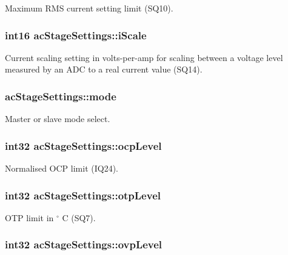 Maximum R\-M\-S current setting limit (S\-Q10). \hypertarget{a00004_ade324e2ab9ea9a6d3620cf7028cc4c1d}{
\subsubsection[{i\-Scale}]{\setlength{\rightskip}{0pt plus 5cm}int16 ac\-Stage\-Settings\-::i\-Scale}}\label{a00004_ade324e2ab9ea9a6d3620cf7028cc4c1d}
Current scaling setting in volts-\/per-\/amp for scaling between a voltage level measured by an A\-D\-C to a real current value (S\-Q14). \hypertarget{a00004_a3cb6e49a13279ff6c21dfdb9ee7f2f83}{
\subsubsection[{mode}]{ ac\-Stage\-Settings\-::mode}}\label{a00004_a3cb6e49a13279ff6c21dfdb9ee7f2f83}
Master or slave mode select. \hypertarget{a00004_a96fd85bb29c3f2ce0515eedbc353cd9f}{
\subsubsection[{ocp\-Level}]{\setlength{\rightskip}{0pt plus 5cm}int32 ac\-Stage\-Settings\-::ocp\-Level}}\label{a00004_a96fd85bb29c3f2ce0515eedbc353cd9f}
Normalised O\-C\-P limit (I\-Q24). \hypertarget{a00004_a650064b66038e3805f5bd42459d01bb4}{
\subsubsection[{otp\-Level}]{\setlength{\rightskip}{0pt plus 5cm}int32 ac\-Stage\-Settings\-::otp\-Level}}\label{a00004_a650064b66038e3805f5bd42459d01bb4}
O\-T\-P limit in $ ^\circ$ C (S\-Q7). \hypertarget{a00004_a8b5f24f22b2b5c641cb4b81d27a13ff7}{
\subsubsection[{ovp\-Level}]{\setlength{\rightskip}{0pt plus 5cm}int32 ac\-Stage\-Settings\-::ovp\-Level}}\label{a00004_a8b5f24f22b2b5c641cb4b81d27a13ff7}
